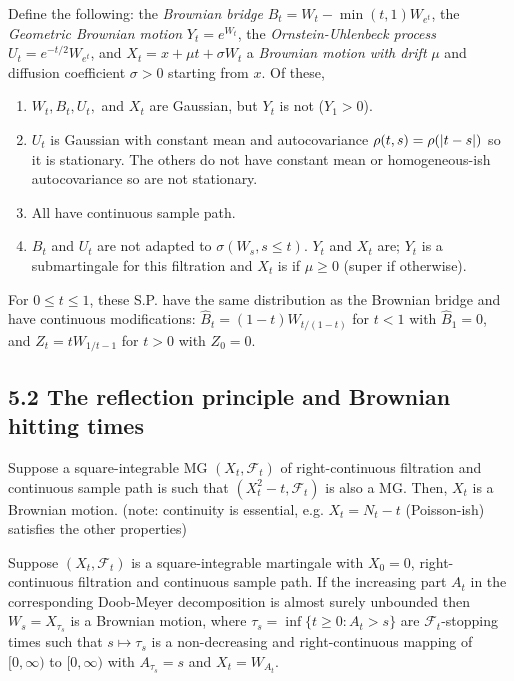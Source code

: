 \begin{exercise*}
Define the following: the \emph{Brownian bridge} $B_t=W_t - \min(t,1)W_{e^t}$, the \emph{Geometric Brownian motion} $Y_t = e^{W_t}$, the \emph{Ornstein-Uhlenbeck process} $U_t = e^{-t/2} W_{e^t}$, and $X_t = x + \mu t + \sigma W_t$ a \emph{Brownian motion with drift} $\mu$ and diffusion coefficient $\sigma > 0$ starting from $x$. Of these,
\begin{enumerate}
\item $W_t, B_t, U_t,$ and $X_t$ are Gaussian, but $Y_t$ is not ($Y_1 > 0$).
\item $U_t$ is Gaussian with constant mean and autocovariance $\rho(t,s) = \rho(\left\lvert t-s \right\rvert)$ so it is stationary. The others do not have constant mean or homogeneous-ish autocovariance so are not stationary.
\item All have continuous sample path.
\item $B_t$ and $U_t$ are not adapted to $\sigma(W_s,s\leq t)$. $Y_t$ and $X_t$ are; $Y_t$ is a submartingale for this filtration and $X_t$ is if $\mu \geq 0$ (super if otherwise).
\end{enumerate}
\end{exercise*}

\begin{exercise*}
For $0\leq t \leq1$, these S.P. have the same distribution as the Brownian bridge and have continuous modifications: $\hat B_t = (1-t)W_{t/(1-t)}$ for $t<1$ with $\hat B_1 = 0$, and $Z_t = tW_{1/t-1}$ for $t > 0$ with $Z_0=0$.
\end{exercise*}

\subsection*{5.2 The reflection principle and Brownian hitting times}

\begin{theorem*}
Suppose a square-integrable MG $(X_t,\mathcal F_t)$ of right-continuous filtration and continuous sample path is such that $(X_t^2 - t, \mathcal F_t)$ is also a MG. Then, $X_t$ is a Brownian motion. (note: continuity is essential, e.g. $X_t = N_t - t$ (Poisson-ish) satisfies the other properties)
\end{theorem*}

\begin{proposition*}
Suppose $(X_t,\mathcal F_t)$ is a square-integrable martingale with $X_0=0$, right-continuous filtration and continuous sample path. If the increasing part $A_t$ in the corresponding Doob-Meyer decomposition is almost surely unbounded then $W_s = X_{\tau_s}$ is a Brownian motion, where $\tau_s = \inf\{ t\geq0 : A_t > s\}$ are $\mathcal F_t$-stopping times such that $s\mapsto \tau_s$ is a non-decreasing and right-continuous mapping of $[0,\infty)$ to $[0,\infty)$ with $A_{\tau_s} = s$ and $X_t = W_{A_t}$.
\end{proposition*}

